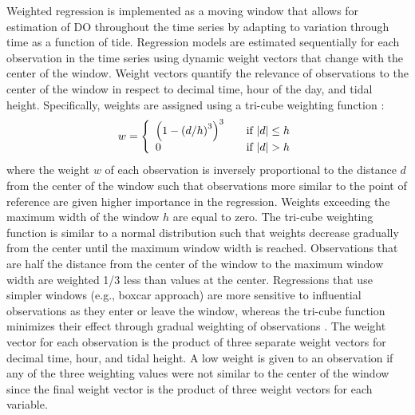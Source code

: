 \documentclass[letterpaper,12pt,oneside]{article}\usepackage[]{graphicx}\usepackage[]{color}
\begin{document}
Weighted regression is implemented as a moving window that allows for estimation of \ac{DO} throughout the time series by adapting to variation through time as a function of tide. Regression models are estimated sequentially for each observation in the time series using dynamic weight vectors that change with the center of the window.  Weight vectors quantify the relevance of observations to the center of the window in respect to decimal time, hour of the day, and tidal height.  Specifically, weights are assigned using a tri-cube weighting function \citep{Hirsch10}:
\begin{equation}
w= \left\{ 
  \begin{array}{l l}
    \left(1-\left(d/h\right)^3\right)^3 & \quad \textrm{if } |d| \leq h \\
    0 & \quad \textrm{if } |d| > h 
  \end{array} \right.
\end{equation}
where the weight $w$ of each observation is inversely proportional to the distance $d$ from the center of the window such that observations more similar to the point of reference are given higher importance in the regression.  Weights exceeding the maximum width of the window $h$ are equal to zero.  The tri-cube weighting function is similar to a normal distribution such that weights decrease gradually from the center until the maximum window width is reached.  Observations that are half the distance from the center of the window to the maximum window width are weighted 1/3 less than values at the center.  Regressions that use simpler windows (e.g., boxcar approach) are  more sensitive to influential observations as they enter or leave the window, whereas the tri-cube function minimizes their effect through gradual weighting of observations \citep{Hirsch10}.  The weight vector for each observation is the product of three separate weight vectors for decimal time, hour, and tidal height. A low weight is given to an observation if any of the three weighting values were not similar to the center of the window since the final weight vector is the product of three weight vectors for each variable.    
\end{document}
